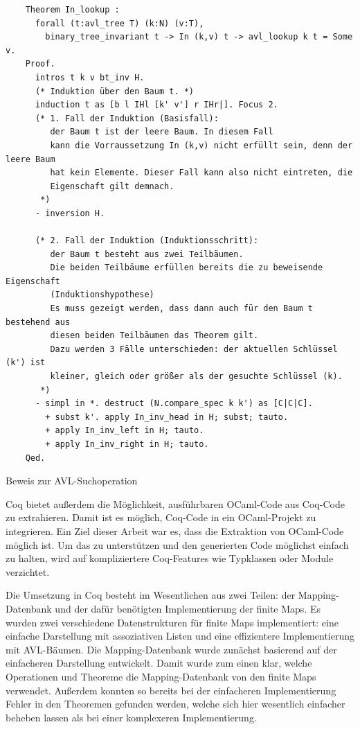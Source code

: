 \documentclass[a4paper, parskip]{scrartcl}
\begin{document}
\begin{listing}
  \begin{verbatim}
    Theorem In_lookup :
      forall (t:avl_tree T) (k:N) (v:T),
        binary_tree_invariant t -> In (k,v) t -> avl_lookup k t = Some v.
    Proof.
      intros t k v bt_inv H. 
      (* Induktion über den Baum t. *)
      induction t as [b l IHl [k' v'] r IHr|]. Focus 2.
      (* 1. Fall der Induktion (Basisfall):
         der Baum t ist der leere Baum. In diesem Fall 
         kann die Vorraussetzung In (k,v) nicht erfüllt sein, denn der leere Baum
         hat kein Elemente. Dieser Fall kann also nicht eintreten, die 
         Eigenschaft gilt demnach.
       *)
      - inversion H.      

      (* 2. Fall der Induktion (Induktionsschritt): 
         der Baum t besteht aus zwei Teilbäumen. 
         Die beiden Teilbäume erfüllen bereits die zu beweisende Eigenschaft 
         (Induktionshypothese)
         Es muss gezeigt werden, dass dann auch für den Baum t bestehend aus 
         diesen beiden Teilbäumen das Theorem gilt.
         Dazu werden 3 Fälle unterschieden: der aktuellen Schlüssel (k') ist 
         kleiner, gleich oder größer als der gesuchte Schlüssel (k).
       *)
      - simpl in *. destruct (N.compare_spec k k') as [C|C|C].
        + subst k'. apply In_inv_head in H; subst; tauto.
        + apply In_inv_left in H; tauto.
        + apply In_inv_right in H; tauto.
    Qed.
  \end{verbatim}
  \caption{Beweis zur AVL-Suchoperation}
  \label{lst:avl-lookup-proof}
\end{listing}

Coq bietet außerdem die Möglichkeit, ausführbaren OCaml-Code aus Coq-Code zu extrahieren.\autocite{extract-overview}
Damit ist es möglich, Coq-Code in ein OCaml-Projekt zu integrieren.
Ein Ziel dieser Arbeit war es, dass die Extraktion von OCaml-Code möglich ist.
Um das zu unterstützen und den generierten Code möglichst einfach zu halten, wird auf kompliziertere Coq-Features wie Typklassen oder Module verzichtet.

Die Umsetzung in Coq besteht im Wesentlichen aus zwei Teilen: der Mapping-Datenbank und der dafür benötigten Implementierung der finite Maps.
Es wurden zwei verschiedene Datenstrukturen für finite Maps implementiert: eine einfache Darstellung mit assoziativen Listen und eine effizientere Implementierung mit AVL-Bäumen.
Die Mapping-Datenbank wurde zunächst basierend auf der einfacheren Darstellung entwickelt.
Damit wurde zum einen klar, welche Operationen und Theoreme die Mapping-Datenbank von den finite Maps verwendet.
Außerdem konnten so bereits bei der einfacheren Implementierung Fehler in den Theoremen gefunden werden, welche sich hier wesentlich einfacher beheben lassen als bei einer komplexeren Implementierung.
\end{document}
